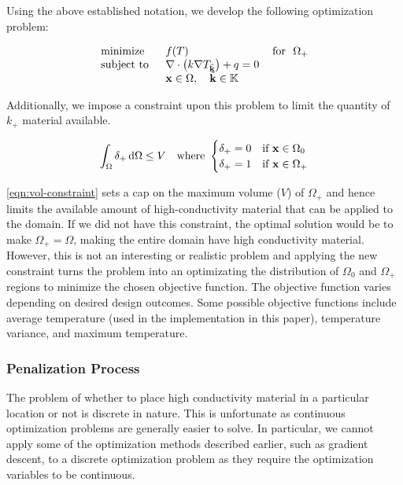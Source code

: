 Using the above established notation, we develop the following optimization problem:

\begin{equation}
	\begin{tabular}{lll}
		\text{minimize }   & $f(T)$                                                   & \text{for } $\Omega_+$ \\
		\text{subject to } & $\nabla\cdot\left(k\nabla T_{\tilde{\mathbf{k}}}\right)+q=0$  &                                      \\
		& $\mathbf{x}\in\Omega,\quad\tilde{\mathbf{k}}\in\mathbb{K}$ &                                      
	\end{tabular}\label{SIMP-Optimization-Problem}
\end{equation}

Additionally, we impose a constraint upon this problem to limit the quantity of $k_+$ material available.

\begin{equation}
	\int_{\Omega}\delta_+\dif\Omega\leq V\quad\text{where }\begin{cases}\delta_+ = 0 & \text{if }\mathbf{x}\in\Omega_0 \\ \delta_+ = 1 & \text{if }\mathbf{x}\in\Omega_+\end{cases}\label{eqn:vol-constraint}
\end{equation}

\eqref{eqn:vol-constraint} sets a cap on the maximum volume ($V$) of $\Omega_+$ and hence limits the available amount of high-conductivity material that can be applied to the domain. If we did not have this constraint, the optimal solution would be to make $\Omega_+=\Omega$, making the entire domain have high conductivity material. However, this is not an interesting or realistic problem and applying the new constraint turns the problem into an optimizating the distribution of $\Omega_0$ and $\Omega_+$ regions to minimize the chosen objective function. The objective function varies depending on desired design outcomes. Some possible objective functions include average temperature (used in the implementation in this paper), temperature variance, and maximum temperature.

\subsubsection*{Penalization Process}
The problem of whether to place high conductivity material in a particular location or not is discrete in nature. This is unfortunate as continuous optimization problems are generally easier to solve. In particular, we cannot apply some of the optimization methods described earlier, such as gradient descent, to a discrete optimization problem as they require the optimization variables to be continuous.


